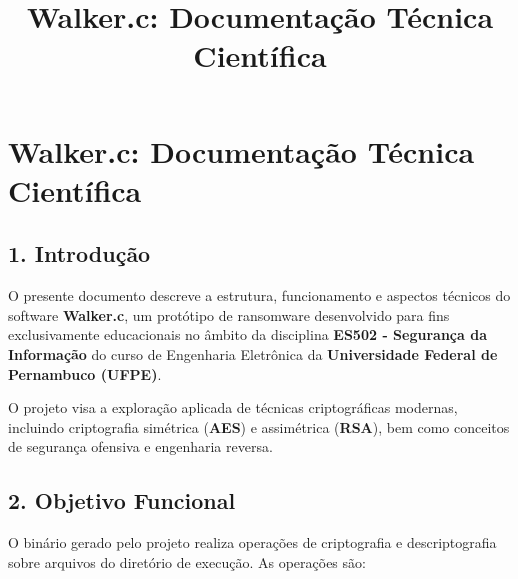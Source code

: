 \documentclass[a4paper,12pt]{article}
\title{Walker.c: Documentação Técnica Científica}
\author{}
\date{}
\begin{document}
\maketitle
\section*{Walker.c: Documentação Técnica Científica}

\subsection*{1. Introdução}

O presente documento descreve a estrutura, funcionamento e aspectos técnicos do software \textbf{Walker.c}, um protótipo de ransomware desenvolvido para fins exclusivamente educacionais no âmbito da disciplina \textbf{ES502 - Segurança da Informação} do curso de Engenharia Eletrônica da \textbf{Universidade Federal de Pernambuco (UFPE)}.

O projeto visa a exploração aplicada de técnicas criptográficas modernas, incluindo criptografia simétrica (\textbf{AES}) e assimétrica (\textbf{RSA}), bem como conceitos de segurança ofensiva e engenharia reversa. 

\subsection*{2. Objetivo Funcional}

O binário gerado pelo projeto realiza operações de criptografia e descriptografia sobre arquivos do diretório de execução. As operações são:
\end{document}

